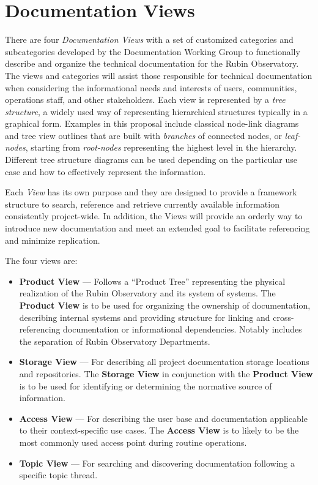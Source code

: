 \section{Documentation Views}
\label{sec:views}

There are four \emph{Documentation Views} with a set of customized categories and subcategories developed by the Documentation Working Group to functionally describe and organize the technical documentation for the Rubin Observatory.
The views and categories will assist those responsible for technical documentation when considering the informational needs and interests of users, communities, operations staff, and other stakeholders.
Each view is represented by a \emph{tree structure}, a widely used way of representing hierarchical structures typically in a graphical form.
Examples in this proposal include classical node-link diagrams and tree view outlines that are built with \emph{branches} of connected nodes, or \emph{leaf-nodes}, starting from \emph{root-nodes} representing the highest level in the hierarchy.
Different tree structure diagrams can be used depending on the particular use case and how to effectively represent the information.
\citep{wiki-tree-diagram-cite}

Each \emph{View} has its own purpose and they are designed to provide a framework structure to search, reference and retrieve currently available information consistently project-wide.
In addition, the Views will provide an orderly way to introduce new documentation and meet an extended goal to facilitate referencing and minimize replication.

The four views are:

\begin{itemize}

  \item \textbf{Product View} --- Follows a ``Product Tree'' representing the physical realization of the Rubin Observatory and its system of systems.
  The \textbf{Product View} is to be used for organizing the ownership of documentation, describing internal systems and providing structure for linking and cross-referencing documentation or informational dependencies.
  Notably includes the separation of Rubin Observatory Departments.

  \item \textbf{Storage View} --- For describing all project documentation storage locations and repositories.
  The \textbf{Storage View} in conjunction with the \textbf{Product View} is to be used for identifying or determining the normative source of information.

  \item \textbf{Access View} --- For describing the user base and documentation applicable to their context-specific use cases.
  The \textbf{Access View} is to likely to be the most commonly used access point during routine operations.

  \item \textbf{Topic View} --- For searching and discovering documentation following a specific topic thread.

\end{itemize}

